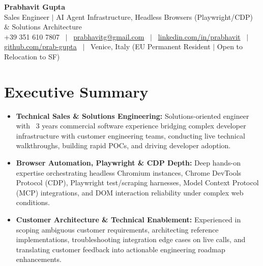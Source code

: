 \documentclass[a4paper,10pt]{article}
\begin{document}
\begin{minipage}[c]{0.80\textwidth}
  {\Huge\bfseries Prabhavit Gupta}\\[3pt]
  {\color{accent}\large Sales Engineer $\vert$ AI Agent Infrastructure, Headless Browsers (Playwright/CDP) $\&$ Solutions Architecture}\\[6pt]
  {\footnotesize +39 351 610 7807 ~$\vert$~
  \href{mailto:prabhavitg@gmail.com}{prabhavitg@gmail.com} ~$\vert$~
  \href{https://www.linkedin.com/in/prabhavit/}{linkedin.com/in/prabhavit} ~$\vert$~
  \href{https://github.com/prab-gupta}{github.com/prab-gupta} ~$\vert$~
  Venice, Italy (EU Permanent Resident $\vert$ Open to Relocation to SF)}
\end{minipage}\hfill

\vspace{6pt}

\section{Executive Summary}
\begin{itemize}
  \item \textbf{Technical Sales \& Solutions Engineering:} Solutions-oriented engineer with ~3 years commercial software experience bridging complex developer infrastructure with customer engineering teams, conducting live technical walkthroughs, building rapid POCs, and driving developer adoption.
  \item \textbf{Browser Automation, Playwright \& CDP Depth:} Deep hands-on expertise orchestrating headless Chromium instances, Chrome DevTools Protocol (CDP), Playwright test/scraping harnesses, Model Context Protocol (MCP) integrations, and DOM interaction reliability under complex web conditions.
  \item \textbf{Customer Architecture \& Technical Enablement:} Experienced in scoping ambiguous customer requirements, architecting reference implementations, troubleshooting integration edge cases on live calls, and translating customer feedback into actionable engineering roadmap enhancements.
\end{itemize}

\end{document}
